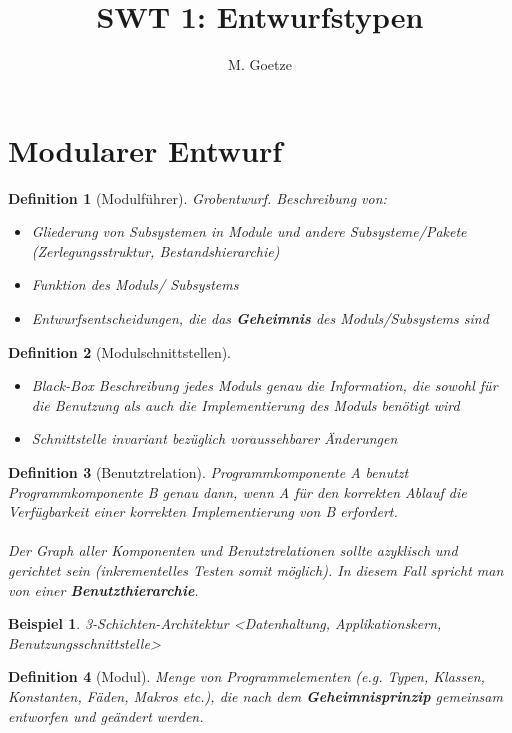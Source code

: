 \documentclass[a4paper]{article}
\title{SWT 1: Entwurfstypen}}
\author{M. Goetze}
\theoremstyle{break}
\newtheorem{defi}{Definition}[section]
\newtheorem{ex}{Beispiel}[section]
\begin{document}
	\maketitle
	\tableofcontents
	\newpage
	
\section{Modularer Entwurf}
\begin{defi}[Modulführer]
	Grobentwurf. Beschreibung von:
	\begin{itemize}
		\item Gliederung von Subsystemen in Module und andere Subsysteme/Pakete (Zerlegungsstruktur, Bestandshierarchie)
		\item Funktion des Moduls/ Subsystems
		\item Entwurfsentscheidungen, die das \textbf{Geheimnis} des Moduls/Subsystems sind
	\end{itemize}
\end{defi}

\begin{defi}[Modulschnittstellen]
	\begin{itemize}
		\item Black-Box Beschreibung jedes Moduls
		\subitem genau die Information, die sowohl für die Benutzung als auch die Implementierung des Moduls benötigt wird
		\item Schnittstelle invariant bezüglich voraussehbarer Änderungen
	\end{itemize}

\end{defi}

\begin{defi}[Benutztrelation]
	Programmkomponente A benutzt Programmkomponente B genau dann, wenn A für den korrekten Ablauf die Verfügbarkeit einer korrekten Implementierung von B erfordert.\\
	\\
	Der Graph aller Komponenten und Benutztrelationen sollte azyklisch und gerichtet sein (inkrementelles Testen somit möglich). In diesem Fall spricht man von einer \textbf{Benutzthierarchie}.
\end{defi}

\begin{ex}
	3-Schichten-Architektur
	<Datenhaltung, Applikationskern, Benutzungsschnittstelle>
\end{ex}

\begin{defi}[Modul]
	Menge von Programmelementen (e.g. Typen, Klassen, Konstanten, Fäden, Makros etc.), die nach dem \textbf{Geheimnisprinzip} gemeinsam entworfen und geändert werden. 
\end{defi}
	
\end{document}
